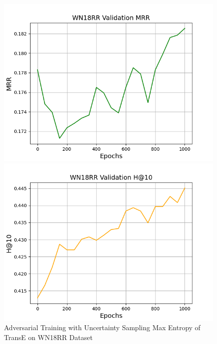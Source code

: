 \begin{figure}
\begin{minipage}{.5\textwidth}
      \includegraphics[width=0.9\linewidth]{figures/results/WN18RR/AdversarialTraining/Uncertainty/Max_Entropy/gan_train_wn18rr_mrr.png}
   \end{minipage}%
    \begin{minipage}{.5\textwidth}
      \centering
      \includegraphics[width=0.9\linewidth]{figures/results/WN18RR/AdversarialTraining/Uncertainty/Max_Entropy/gan_train_wn18rr_hit10.png}
    \end{minipage}%
    \caption{Adversarial Training with Uncertainty Sampling Max Entropy of TransE on WN18RR Dataset}
    \label{fig:test}
\end{figure}